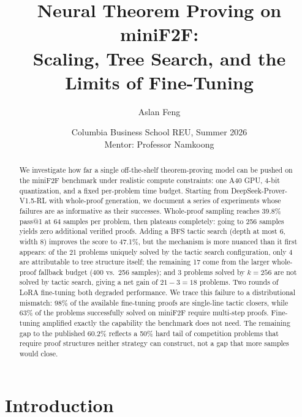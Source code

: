 \documentclass[openany, amssymb, psamsfonts]{amsart}
\title[Neural Theorem Proving on miniF2F]{Neural Theorem Proving on miniF2F: \\
Scaling, Tree Search, and the Limits of Fine-Tuning}
\author[\ ]{Aslan Feng}
\date{Columbia Business School REU, Summer 2026 \\
Mentor: Professor Namkoong}
\theoremstyle{definition}
\numberwithin{equation}{section}
\begin{document}
\begin{abstract}
We investigate how far a single off-the-shelf theorem-proving model can be pushed on
the miniF2F benchmark under realistic compute constraints: one A40 GPU, 4-bit
quantization, and a fixed per-problem time budget.
Starting from DeepSeek-Prover-V1.5-RL with whole-proof generation,
we document a series of experiments whose failures are as informative as their successes.
Whole-proof sampling reaches 39.8\% pass@1 at 64 samples per problem, then plateaus
completely: going to 256 samples yields zero additional verified proofs.
Adding a BFS tactic search (depth at most 6, width 8) improves the score to 47.1\%,
but the mechanism is more nuanced than it first appears: of the 21
problems uniquely solved by the tactic search configuration, only 4 are attributable to tree
structure itself; the remaining 17 come from the larger whole-proof fallback budget
(400 vs.\ 256 samples); and 3 problems solved by $k=256$ are not solved by tactic search,
giving a net gain of $21 - 3 = 18$ problems.
Two rounds of LoRA fine-tuning both degraded performance.
We trace this failure to a distributional mismatch: 98\% of the available
fine-tuning proofs are single-line tactic closers, while 63\% of the problems
successfully solved on miniF2F require multi-step proofs.
Fine-tuning amplified exactly the capability the benchmark does not need.
The remaining gap to the published 60.2\% reflects a 50\% hard tail of competition
problems that require proof structures neither strategy can construct, not a
gap that more samples would close.
\end{abstract}

\maketitle

\pagestyle{fancy}
\fancyhf{}
\fancyfoot[C]{\thepage}
\renewcommand{\headrulewidth}{0pt}
\setlength{\headheight}{14pt}

\tableofcontents

\section{Introduction}
\end{document}
